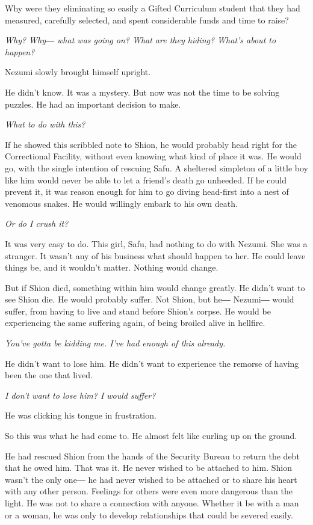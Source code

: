 Why were they eliminating so easily a Gifted Curriculum student that
they had measured, carefully selected, and spent considerable funds and
time to raise?

\emph{Why? Why― what was going on? What are they hiding? What's about to
happen?}

Nezumi slowly brought himself upright.

He didn't know. It was a mystery. But now was not the time to be solving
puzzles. He had an important decision to make.

\emph{What to do with this?}

If he showed this scribbled note to Shion, he would probably head right
for the Correctional Facility, without even knowing what kind of place
it was. He would go, with the single intention of rescuing Safu. A
sheltered simpleton of a little boy like him would never be able to let
a friend's death go unheeded. If he could prevent it, it was reason
enough for him to go diving head-first into a nest of venomous snakes.
He would willingly embark to his own death.

\emph{Or do I crush it?}

It was very easy to do. This girl, Safu, had nothing to do with Nezumi.
She was a stranger. It wasn't any of his business what should happen to
her. He could leave things be, and it wouldn't matter. Nothing would
change.

But if Shion died, something within him would change greatly. He didn't
want to see Shion die. He would probably suffer. Not Shion, but he―
Nezumi― would suffer, from having to live and stand before Shion's
corpse. He would be experiencing the same suffering again, of being
broiled alive in hellfire.

\emph{You've gotta be kidding me. I've had enough of this already.}

He didn't want to lose him. He didn't want to experience the remorse of
having been the one that lived.

\emph{I don't want to lose him? I would suffer?}

He was clicking his tongue in frustration.

So this was what he had come to. He almost felt like curling up on the
ground.

He had rescued Shion from the hands of the Security Bureau to return the
debt that he owed him. That was it. He never wished to be attached to
him. Shion wasn't the only one― he had never wished to be attached or to
share his heart with any other person. Feelings for others were even
more dangerous than the light. He was not to share a connection with
anyone. Whether it be with a man or a woman, he was only to develop
relationships that could be severed easily.

